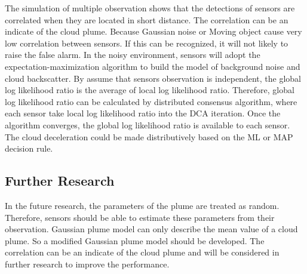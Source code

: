 The simulation of multiple observation shows that the detections of
sensors are correlated when they are located in short distance. The
correlation can be an indicate of the cloud plume. Because Gaussian
noise or Moving object cause very low correlation between sensors.
If this can be recognized, it will not likely to raise the false alarm.
In the noisy environment, sensors will adopt the expectation-maximization
algorithm to build the model of background noise and cloud backscatter.
By assume that sensors observation is independent, the global log
likelihood ratio is the average of local log likelihood ratio. Therefore,
global log likelihood ratio can be calculated by distributed consensus
algorithm, where each sensor take local log likelihood ratio into
the DCA iteration. Once the algorithm converges, the global log likelihood
ratio is available to each sensor. The cloud deceleration could be
made distributively based on the ML or MAP decision rule. 


\subsection{Further Research}

In the future research, the parameters of the plume are treated as
random. Therefore, sensors should be able to estimate these parameters
from their observation. Gaussian plume model can only describe the
mean value of a cloud plume. So a modified Gaussian plume model should
be developed. The correlation can be an indicate of the cloud plume
and will be considered in further research to improve the performance.
